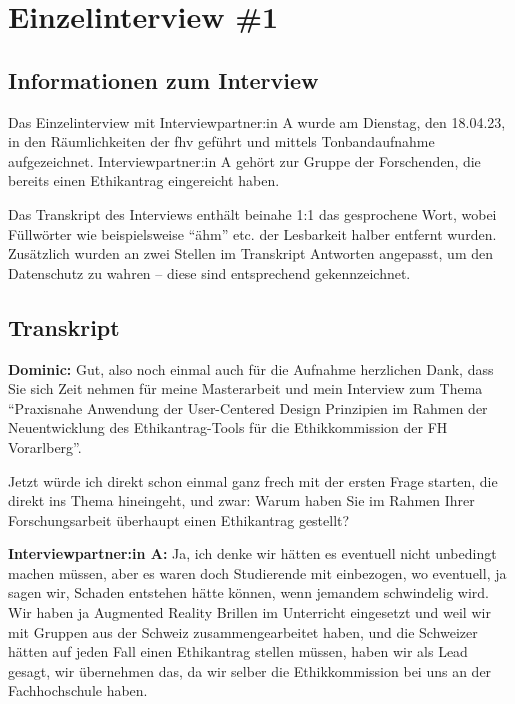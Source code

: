 \documentclass[a4paper,12pt,twoside]{scrreprt}
\begin{document}


\cleardoublepage
\chapter{Einzelinterview \#1}
\label{appendix:interview-1}

\section{Informationen zum Interview}
\label{appendix:interview-1-infos}

Das Einzelinterview mit Interviewpartner:in A wurde am Dienstag, den 18.04.23, in den Räumlichkeiten der \ac{fhv} geführt und mittels Tonbandaufnahme aufgezeichnet. Interviewpartner:in A gehört zur Gruppe der Forschenden, die bereits einen Ethikantrag eingereicht haben.

Das Transkript des Interviews enthält beinahe 1:1 das gesprochene Wort, wobei Füllwörter wie beispielsweise \enquote{ähm} etc. der Lesbarkeit halber entfernt wurden. Zusätzlich wurden an zwei Stellen im Transkript Antworten angepasst, um den Datenschutz zu wahren -- diese sind entsprechend gekennzeichnet.

\section{Transkript}
\label{appendix:interview-1-transkript}

\textbf{Dominic:} Gut, also noch einmal auch für die Aufnahme herzlichen Dank, dass Sie sich Zeit nehmen für meine Masterarbeit und mein Interview zum Thema \enquote{Praxisnahe Anwendung der User-Centered Design Prinzipien im Rahmen der Neuentwicklung des Ethikantrag-Tools für die Ethikkommission der FH Vorarlberg}.

Jetzt würde ich direkt schon einmal ganz frech mit der ersten Frage starten, die direkt ins Thema hineingeht, und zwar: Warum haben Sie im Rahmen Ihrer Forschungsarbeit überhaupt einen Ethikantrag gestellt?

\textbf{Interviewpartner:in A:} Ja, ich denke wir hätten es eventuell nicht unbedingt machen müssen, aber es waren doch Studierende mit einbezogen, wo eventuell, ja sagen wir, Schaden entstehen hätte können, wenn jemandem schwindelig wird. Wir haben ja Augmented Reality Brillen im Unterricht eingesetzt und weil wir mit Gruppen aus der Schweiz zusammengearbeitet haben, und die Schweizer hätten auf jeden Fall einen Ethikantrag stellen müssen, haben wir als Lead gesagt, wir übernehmen das, da wir selber die Ethikkommission bei uns an der Fachhochschule haben.
\end{document}
